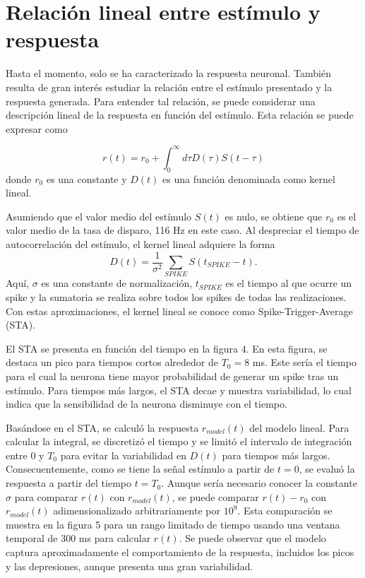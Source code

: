 \documentclass[aps,prb,twocolumn,superscriptaddress,floatfix,longbibliography]{revtex4-2}
\newcounter{para}
\begin{document}
\section{Relación lineal entre estímulo y respuesta}

Hasta el momento, solo se ha caracterizado la respuesta neuronal. También resulta de gran interés estudiar la relación entre el estímulo presentado y la respuesta generada. Para entender tal relación, se puede considerar una descripción lineal de la respuesta en función del estímulo. Esta relación se puede expresar como

\[r(t) = r_0 + \int_0^\infty d\tau D(\tau) S(t - \tau)\]
donde \( r_0 \) es una constante y \( D(t) \) es una función denominada como kernel lineal.

Asumiendo que el valor medio del estímulo $S(t)$ es nulo, se obtiene que $r_0$ es el valor medio de la tasa de disparo, 116 Hz en este caso. Al despreciar el tiempo de autocorrelación del estímulo, el kernel lineal adquiere la forma
\[D(t) = \frac{1}{\sigma^2} \sum_{SPIKE} S(t_{SPIKE} - t).\]
Aquí, \( \sigma \) es una constante de normalización, $t_{SPIKE}$ es el tiempo al que ocurre un spike y la sumatoria se realiza sobre todos los spikes de todas las realizaciones. Con estas aproximaciones, el kernel lineal se conoce como Spike-Trigger-Average (STA).

El STA se presenta en función del tiempo en la figura 4. En esta figura, se destaca un pico para tiempos cortos alrededor de \( T_0 = 8 \) ms. Este sería el tiempo para el cual la neurona tiene mayor probabilidad de generar un spike tras un estímulo. Para tiempos más largos, el STA decae y muestra variabilidad, lo cual indica que la sensibilidad de la neurona disminuye con el tiempo.

Basándose en el STA, se calculó la respuesta  \( r_{model}(t) \) del modelo lineal. Para calcular la integral, se discretizó el tiempo y se limitó el intervalo de integración entre 0 y \( T_0 \) para evitar la variabilidad en \( D(t) \) para tiempos más largos. Consecuentemente, como se tiene la señal estímulo a partir de $t = 0$, se evaluó la respuesta a partir del tiempo \( t = T_0 \). Aunque sería necesario conocer la constante \( \sigma \) para comparar \( r(t) \) con \( r_{model}(t) \), se puede comparar \( r(t) - r_0 \) con \( r_{model}(t) \) adimensionalizado arbitrariamente por \( 10^9 \). Esta comparación se muestra en la figura 5 para un rango limitado de tiempo usando una ventana temporal de 300 ms para calcular \( r(t) \). Se puede observar que el modelo captura aproximadamente el comportamiento de la respuesta, incluidos los picos y las depresiones, aunque presenta una gran variabilidad.
\end{document}
